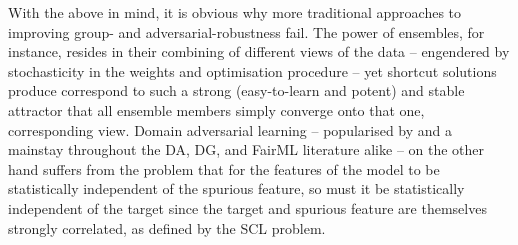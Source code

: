 With the above in mind, it is obvious why more traditional approaches to improving group- and
adversarial-robustness fail. 
%
The power of ensembles, for instance, resides in their combining of different views of the data --
engendered by stochasticity in the weights and optimisation procedure -- yet shortcut solutions
produce correspond to such a strong (easy-to-learn and potent) and stable attractor that all
ensemble members simply converge onto that one, corresponding view.
%
Domain adversarial learning -- popularised by \cite{ganin2016domain} and a mainstay throughout the
DA, DG, and FairML literature alike -- on the other hand suffers from the problem that for the
features of the model to be statistically independent of the spurious feature, so must it be
statistically independent of the target since the target and spurious feature are themselves
strongly correlated, as defined by the SCL problem.
%



